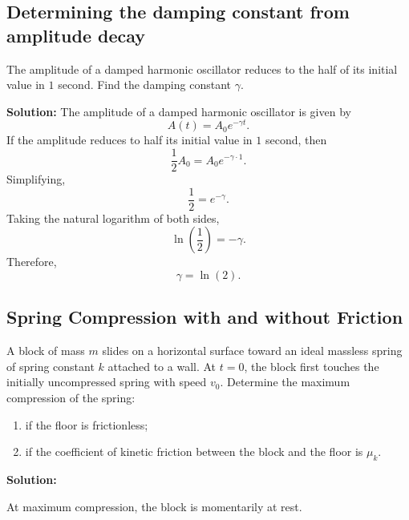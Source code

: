 \documentclass[12pt]{article}
\begin{document}
\subsection{Determining the damping constant from amplitude decay}

The amplitude of a damped harmonic oscillator reduces to the half of its initial value in $1$ second. Find the damping constant $\gamma$.

\textbf{Solution:}
The amplitude of a damped harmonic oscillator is given by
\begin{equation}
    A(t)=A_0 e^{-\gamma t}.
\end{equation}
If the amplitude reduces to half its initial value in $1$ second, then
\begin{equation}
    \frac{1}{2}A_0=A_0 e^{-\gamma \cdot 1}.
\end{equation}
Simplifying,
\begin{equation}
    \frac{1}{2}=e^{-\gamma}.
\end{equation}
Taking the natural logarithm of both sides,
\begin{equation}
    \ln\left(\frac{1}{2}\right)=-\gamma.
\end{equation}
Therefore,
\begin{equation}
    \boxed{\gamma=\ln(2)}.
\end{equation}

\subsection{Spring Compression with and without Friction}

A block of mass $m$ slides on a horizontal surface toward an ideal
massless spring of spring constant $k$ attached to a wall. At $t=0$,
the block first touches the initially uncompressed spring with speed
$v_0$. Determine the maximum compression of the spring:
\begin{enumerate}
    \item[(a)] if the floor is frictionless;
    \item[(b)] if the coefficient of kinetic friction between the block
    and the floor is $\mu_k$.
\end{enumerate}

\textbf{Solution:}

At maximum compression, the block is momentarily at rest.
\end{document}
